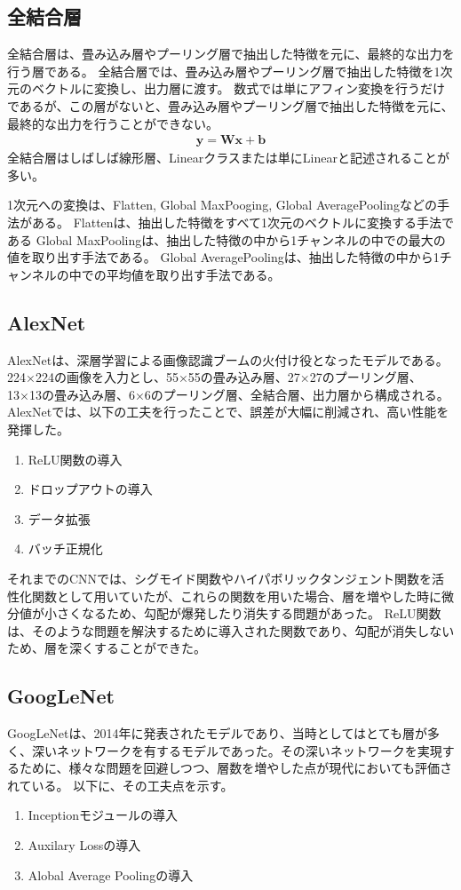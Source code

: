 \documentclass{ltjsarticle}
\begin{document}
\subsection{全結合層}
全結合層は、畳み込み層やプーリング層で抽出した特徴を元に、最終的な出力を行う層である。
全結合層では、畳み込み層やプーリング層で抽出した特徴を1次元のベクトルに変換し、出力層に渡す。
数式では単にアフィン変換を行うだけであるが、この層がないと、畳み込み層やプーリング層で抽出した特徴を元に、最終的な出力を行うことができない。
\begin{align}
  \mathbf{y} = \mathbf{W} \mathbf{x} + \mathbf{b}
\end{align}
全結合層はしばしば線形層、Linearクラスまたは単にLinearと記述されることが多い。
\par
1次元への変換は、Flatten, Global MaxPooging, Global AveragePoolingなどの手法がある。
Flattenは、抽出した特徴をすべて1次元のベクトルに変換する手法である
Global MaxPoolingは、抽出した特徴の中から1チャンネルの中での最大の値を取り出す手法である。
Global AveragePoolingは、抽出した特徴の中から1チャンネルの中での平均値を取り出す手法である。


\subsection{AlexNet}
AlexNetは、深層学習による画像認識ブームの火付け役となったモデルである。
224×224の画像を入力とし、55×55の畳み込み層、27×27のプーリング層、13×13の畳み込み層、6×6のプーリング層、全結合層、出力層から構成される。
AlexNetでは、以下の工夫を行ったことで、誤差が大幅に削減され、高い性能を発揮した。
\begin{enumerate}
  \item ReLU関数の導入
  \item ドロップアウトの導入
  \item データ拡張
  \item バッチ正規化
\end{enumerate}

それまでのCNNでは、シグモイド関数やハイパボリックタンジェント関数を活性化関数として用いていたが、これらの関数を用いた場合、層を増やした時に微分値が小さくなるため、勾配が爆発したり消失する問題があった。
ReLU関数は、そのような問題を解決するために導入された関数であり、勾配が消失しないため、層を深くすることができた。

\subsection{GoogLeNet}
GoogLeNetは、2014年に発表されたモデルであり、当時としてはとても層が多く、深いネットワークを有するモデルであった。その深いネットワークを実現するために、様々な問題を回避しつつ、層数を増やした点が現代においても評価されている。
以下に、その工夫点を示す。
\begin{enumerate}
  \item Inceptionモジュールの導入
  \item Auxilary Lossの導入
  \item Alobal Average Poolingの導入
\end{enumerate}
\end{document}
